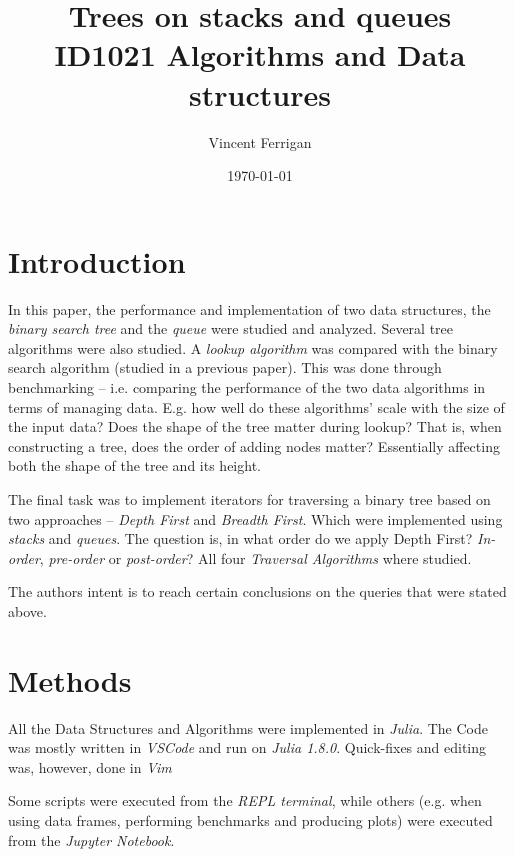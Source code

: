 \documentclass[a4paper, 11pt]{article}
\title{Trees on stacks and queues\\ \small{ID1021 Algorithms and Data structures}} %
\author{Vincent Ferrigan}
\date{\today}
\begin{document}
    \maketitle
    \section*{Introduction}
    \label{sec:introduction}
    In this paper, the performance and implementation of two data structures, 
    the \emph{binary search tree} and the \emph{queue} were studied and analyzed. 
    Several tree algorithms were also studied. 
    A \emph{lookup algorithm} was compared with the binary search algorithm 
    (studied in a previous paper).  %
    This was done through benchmarking -- i.e. comparing the performance of
    the two data algorithms in terms of managing data. E.g. how well do these
    algorithms' scale with the size of the input data? 
    Does the shape of the tree matter during lookup? That is, when 
    constructing a tree, does the order of adding nodes matter? 
    Essentially affecting both the shape of the tree and its height. %

    The final task was to implement iterators for traversing a binary tree 
    based on two approaches 
    -- \emph{Depth First} and \emph{Breadth First}. 
    Which were implemented using \emph{stacks} and \emph{queues}.
    The question is, in what order do we apply Depth First? 
    \emph{In-order}, \emph{pre-order} or \emph{post-order}? 
    All four \emph{Traversal Algorithms} where studied. 
    
    The authors intent is to reach certain conclusions on the queries that were
    stated above. 
    
    \section*{Methods}
    All the Data Structures and Algorithms were implemented in \emph{Julia}.
    The Code was mostly written in \emph{VSCode} and run on \emph{Julia 1.8.0}.
    Quick-fixes and editing was, however, done in \emph{Vim}

    Some scripts were executed from the \emph{REPL terminal},  while others (e.g.
    when using data frames, performing benchmarks and producing plots) 
    were executed from the \emph{Jupyter Notebook}. 
    
\end{document}
